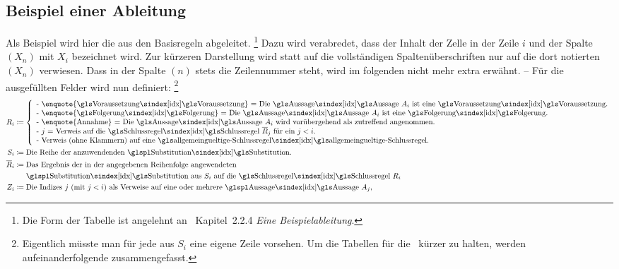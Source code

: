 {\subsection{Beispiel einer Ableitung}%
\label{sub:BeispielAbleitung}

Als Beispiel wird hier die  aus den Basisregeln abgeleitet.%
\footnote{%
	Die Form der Tabelle ist angelehnt an~\cite{bib:NatuerlichesSchliessen} Kapitel~2.2.4 \emph{Eine Beispielableitung}.
}
Dazu wird verabredet, dass  der Inhalt der Zelle in der Zeile $i$ und der Spalte $(X_n)$ mit $X_i$ bezeichnet wird.
Zur kürzeren Darstellung wird statt auf die vollständigen Spaltenüberschriften nur auf die dort notierten $(X_n)$ verwiesen. Dass in der Spalte $(n)$ stets die Zeilennummer steht, wird im folgenden nicht mehr extra erwähnt.
-- Für die ausgefüllten Felder wird nun definiert:%
\footnote{%
	Eigentlich müsste man für jede  aus $S_i$ eine eigene Zeile vorsehen.
	Um die Tabellen für die \Beweise\ kürzer zu halten, werden aufeinanderfolgende  zusammengefasst.
}
\begin{align}
	R_i & \defeq
	\left\{
		\begin{array}{l}
			\text{- \enquote{\glsIdx{Voraussetzung}} = Die \glsIdx{Aussage} $A_i$ ist eine \glsIdx{Voraussetzung}.}\\
			\text{- \enquote{\glsIdx{Folgerung}} = Die \glsIdx{Aussage} $A_i$ ist eine \glsIdx{Folgerung}.}\\
			\text{- \enquote{Annahme} = Die \glsIdx{Aussage} $A_i$ wird vorübergehend als zutreffend angenommen.}\\
			\text{- $j$ = Verweis auf die \glsIdx{Schlussregel} $\overline{R}_j$ für ein $j < i$.}\\
			\text{- Verweis (ohne Klammern) auf eine \glsIdx{allgemeingueltige-Schlussregel}.}
		\end{array}
	\right.
	\\
	S_i & \defeq \text{Die Reihe der anzuwendenden \glsIdxPl{Substitution}.}
	\\
	\overline{R}_i & \defeq \text{Das Ergebnis der in der angegebenen Reihenfolge angewendeten}\\
	& \quad\;\; \text{\glsIdxPl{Substitution} aus $S_i$ auf die \glsIdx{Schlussregel} $R_i$}
	\\
	Z_i & \defeq \text{Die Indizes $j$ (mit $j < i$) als Verweise auf eine oder mehrere \glsIdxPl{Aussage} $A_j$,}\\

\end{align}}
